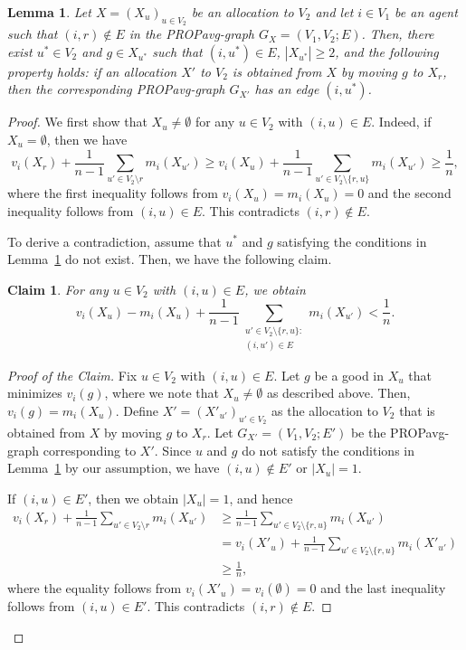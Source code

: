 \documentclass[11pt]{article}
\newtheorem{lemma}[theorem]{Lemma}
\newtheorem{claim}[theorem]{Claim}
\newcommand{\PROPavg}{\textsf{PROPavg}\xspace}
\begin{document}
\begin{lemma}\label{lem: removable}
Let $X=(X_u)_{u \in V_2}$ be an allocation to $V_2$ and let $i \in V_1$ be an agent such that $(i,r)\not \in E$ in the \PROPavg-graph $G_X = (V_1, V_2; E)$. 
Then, there exist $u^*\in V_2$ and $g\in X_{u^*}$ such that 
$(i, u^*)\in E$, $|X_{u^*}|\ge 2$, and the following property holds: 
if an allocation $X'$ to $V_2$ is obtained from $X$ by moving $g$ to $X_r$, then 
the corresponding \PROPavg-graph $G_{X'}$ has an edge $(i, u^*)$. 
\end{lemma}
\begin{proof}
We first show that $X_u \neq\emptyset$ for any $u\in V_2$ with $(i,u)\in E$.
Indeed, if $X_u = \emptyset$, then we have 
$$
v_i(X_r)+\frac{1}{n-1}\sum_{u' \in V_2\setminus r} m_i(X_{u'})\ge v_i(X_u) + \frac{1}{n-1}\sum_{u' \in V_2\setminus \{r, u\}} m_i(X_{u'})\ge \frac{1}{n}, 
$$
where
the first inequality follows from $v_i(X_u)=m_i(X_u)=0$ and the second inequality follows from $(i, u) \in E$.
This contradicts $(i, r)\not \in E$.

To derive a contradiction, assume that 
$u^*$ and $g$ satisfying the conditions in Lemma~\ref{lem: removable} do not exist. 
Then, we have the following claim. 

\begin{claim}\label{cl: ineq}
For any $u\in V_2$ with $(i, u)\in E$, we obtain 
\begin{equation}
v_i(X_u)-m_i(X_u)+\frac{1}{n-1}\sum_{\substack{u'\in V_2\setminus \{r, u\}:\\(i, u')\in E}} m_i(X_{u'}) <\frac{1}{n}. \label{eq: 01}
\end{equation}
\end{claim}
\begin{proof}[Proof of the Claim]
Fix $u\in V_2$ with $(i, u)\in E$. 
Let $g$ be a good in $X_u$ that minimizes $v_i(g)$, where we note that $X_u \not= \emptyset$ as described above. Then, $v_i(g) = m_i(X_u)$. 
Define $X'=(X'_{u'})_{u' \in V_2}$ as the allocation to $V_2$ that is obtained from $X$ by moving $g$ to $X_r$. 
Let $G_{X'}=(V_1, V_2; E')$ be the \PROPavg-graph corresponding to $X'$.
Since $u$ and $g$ do not satisfy the conditions in Lemma~\ref{lem: removable} by our assumption, we have $(i, u) \not\in E'$ or $|X_u| =1$. 

If  $(i, u)\in E'$, then we obtain  $|X_u| = 1$, and hence 
\begin{align*}
v_i(X_{r})+\frac{1}{n-1}\sum_{u'\in V_2\setminus {r}} m_i(X_{u'})  
&\ge \frac{1}{n-1}\sum_{u'\in V_2 \setminus \{r, u\}} m_i(X_{u'})  \\
&= v_i(X'_{u})+\frac{1}{n-1}\sum_{u'\in V_2\setminus \{r, u\}} m_i(X'_{u'}) \\
&\ge \frac{1}{n}, 
\end{align*}
where 
the equality follows from $v_i(X'_{u}) = v_i(\emptyset) = 0$
and the last inequality follows from $(i, u)\in E'$.
This contradicts $(i, r)\not \in E$.


\end{proof}
\end{proof}
\end{document}
